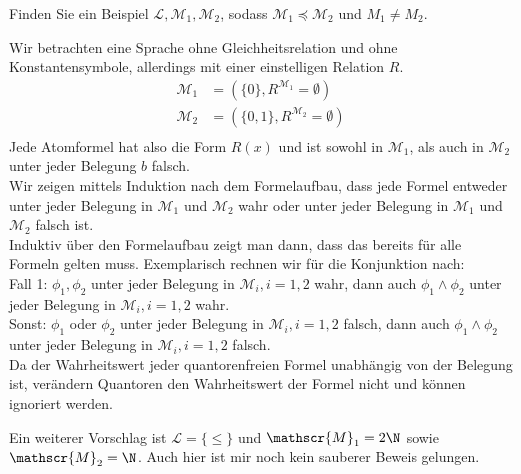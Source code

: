 
\begin{exercise}[143]
Finden Sie ein Beispiel $\mathscr{L},\mathscr{M}_1,\mathscr{M}_2$, sodass
$\mathscr{M}_1 \preccurlyeq \mathscr{M}_2$ und $M_1 \neq M_2$.
\end{exercise}


\begin{solution}
Wir betrachten eine Sprache ohne Gleichheitsrelation und ohne Konstantensymbole, allerdings
mit einer einstelligen Relation $R$.
\begin{align*}
  \mathscr{M}_1 &= (\{0\}, R^{\mathscr{M}_1}= \emptyset) \\
  \mathscr{M}_2 &= (\{0,1\}, R^{\mathscr{M}_2}= \emptyset) \\
\end{align*}
Jede Atomformel hat also die Form $R(x)$ und ist sowohl in $\mathscr{M}_1$,
als auch in $\mathscr{M}_2$ unter jeder Belegung $b$ falsch. \\
Wir zeigen mittels Induktion nach dem Formelaufbau, dass jede Formel
entweder unter jeder Belegung in $\mathscr{M}_1$ und $\mathscr{M}_2$ wahr oder
unter jeder Belegung in $\mathscr{M}_1$ und $\mathscr{M}_2$ falsch ist. \\
Induktiv über den Formelaufbau zeigt man dann, dass das bereits für alle Formeln gelten muss.
Exemplarisch rechnen wir für die Konjunktion nach: \\
Fall 1: $\phi_1,\phi_2$ unter jeder Belegung in $\mathscr{M}_i, i =1,2$ wahr,
dann auch $\phi_1 \land \phi_2$ unter jeder Belegung in $\mathscr{M}_i, i= 1,2$ wahr. \\
Sonst: $\phi_1$ oder $\phi_2$ unter jeder Belegung in $\mathscr{M}_i, i = 1,2$ falsch,
dann auch $\phi_1 \land \phi_2$ unter jeder Belegung in $\mathscr{M}_i, i=1,2$ falsch. \\
Da der Wahrheitswert jeder quantorenfreien Formel unabhängig von der Belegung ist,
verändern Quantoren den Wahrheitswert der Formel nicht und können ignoriert werden.
\end{solution}


\begin{solution}
	Ein weiterer Vorschlag ist $\mathscr{L} = \{\leq\}$ und $\mathscr{M}_1 = 2\N$ sowie $\mathscr{M}_2 = \N$. Auch hier ist mir noch kein sauberer Beweis gelungen.
\end{solution}
